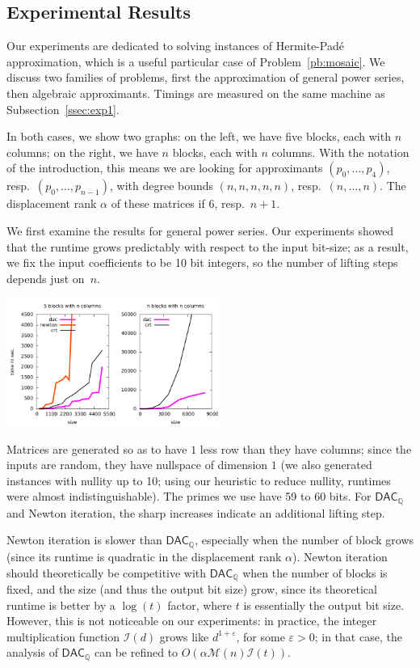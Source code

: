 \documentclass[sigconf]{acmart}
\newcommand{\Q}{\ensuremath{\mathbb{Q}}}
\newcommand{\M}{\ensuremath{\mathscr{M}}}
\newcommand{\I}{\ensuremath{\mathscr{I}}}
\newcommand{\DACQ}{\ensuremath{\mathsf{DAC}_\Q}}
\theoremstyle{acmdefinition}
\begin{document}
\vspace{-5px}
\subsection{Experimental Results}

Our experiments are dedicated to solving instances of Hermite-Pad\'e
approximation, which is a useful particular case of
Problem~\ref{pb:mosaic}. We discuss two families of problems, first
the approximation of general power series, then algebraic
approximants. Timings are measured on the same machine as
Subsection~\ref{ssec:exp1}.

In both cases, we show two graphs: on the left, we have five blocks,
each with $n$ columns; on the right, we have $n$ blocks, each with $n$
columns.  With the notation of the introduction, this means we are
looking for approximants $(p_0,\dots,p_4)$, resp.\
$(p_0,\dots,p_{n-1})$, with degree bounds $(n,n,n,n,n)$, resp.\
$(n,\dots,n)$. The displacement rank $\alpha$ of these matrices if
$6$, resp.\ $n+1$.

We first examine the results for general power series. Our experiments
showed that the runtime grows predictably with respect to the input
bit-size; as a result, we fix the input coefficients to be 10 bit
integers, so the number of lifting steps depends just on~$n$.

\includegraphics[width=7cm]{plots/compare-general.pdf}

Matrices are generated so as to have $1$ less row than they have
columns; since the inputs are random, they have nullspace of dimension
$1$ (we also generated instances with nullity up to 10; using our
heuristic to reduce nullity, runtimes were almost
indistinguishable). The primes we use have 59 to 60 bits.  For $\DACQ$
and Newton iteration, the sharp increases indicate an additional
lifting step.

Newton iteration is slower than $\DACQ$, especially when the number of
block grows (since its runtime is quadratic in the displacement rank
$\alpha$). Newton iteration should theoretically be competitive with
$\DACQ$ when the number of blocks is fixed, and the size (and thus the
output bit size) grow, since its theoretical runtime is better by a
$\log(t)$ factor, where $t$ is essentially the output bit
size. However, this is not noticeable on our experiments: in practice,
the integer multiplication function $\I(d)$ grows like
$d^{1+\varepsilon}$, for some $\varepsilon > 0$; in that case, the
analysis of $\DACQ$ can be refined to $O(\alpha \M(n) \I(t))$. 
\end{document}
